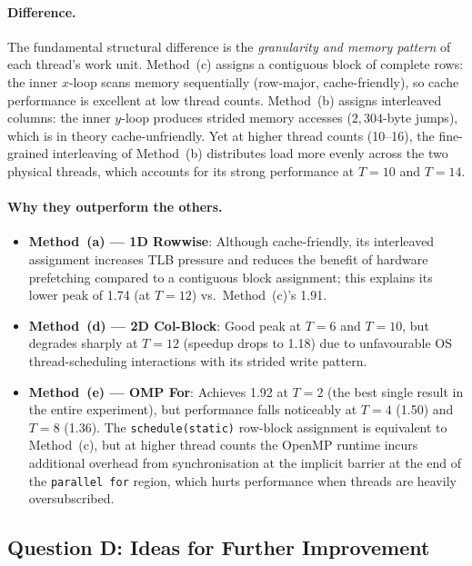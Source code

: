 \paragraph{Difference.}
The fundamental structural difference is the \emph{granularity and memory pattern} of
each thread's work unit.
Method~(c) assigns a contiguous block of complete rows: the inner $x$-loop scans
memory sequentially (row-major, cache-friendly), so cache performance is excellent
at low thread counts.
Method~(b) assigns interleaved columns: the inner $y$-loop produces strided memory
accesses ($2{,}304$-byte jumps), which is in theory cache-unfriendly.
Yet at higher thread counts (10–16), the fine-grained interleaving of Method~(b)
distributes load more evenly across the two physical threads, which accounts for its
strong performance at $T = 10$ and $T = 14$.

\paragraph{Why they outperform the others.}
\begin{itemize}
  \item \textbf{Method~(a) — 1D Rowwise}: Although cache-friendly, its interleaved
        assignment increases TLB pressure and reduces the benefit of hardware
        prefetching compared to a contiguous block assignment; this explains its lower
        peak of 1.74 (at $T=12$) vs.\ Method~(c)'s 1.91.
  \item \textbf{Method~(d) — 2D Col-Block}: Good peak at $T=6$ and $T=10$, but
        degrades sharply at $T=12$ (speedup drops to 1.18) due to unfavourable
        OS thread-scheduling interactions with its strided write pattern.
  \item \textbf{Method~(e) — OMP For}: Achieves 1.92 at $T=2$ (the best single
        result in the entire experiment), but performance falls noticeably at $T=4$
        (1.50) and $T=8$ (1.36).
        The \texttt{schedule(static)} row-block assignment is equivalent to
        Method~(c), but at higher thread counts the OpenMP runtime incurs additional
        overhead from synchronisation at the implicit barrier at the end of the
        \texttt{parallel for} region, which hurts performance when threads are heavily
        oversubscribed.
\end{itemize}

\subsection{Question D: Ideas for Further Improvement}

